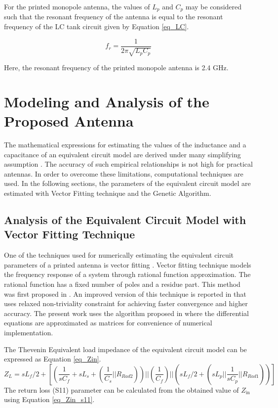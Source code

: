 For the printed monopole antenna, the values of $L_p$ and $C_p$ may be considered such that the resonant frequency of the antenna is equal to the resonant frequency of the LC tank circuit given by Equation \ref{eq_LC}.

\begin{equation}\label{eq_LC}
f_r = \frac{1}{2\pi \sqrt{L_p C_p}}
\end{equation}

Here, the resonant frequency of the printed monopole antenna is 2.4 GHz.

\section{Modeling and Analysis of the Proposed Antenna}\label{c4sec:analysis}
The mathematical expressions for estimating the values of the inductance and a capacitance of an equivalent circuit model are derived under many simplifying assumption \cite{handbook}. The accuracy of such empirical relationships is not high for practical antennas. In order to overcome these limitations, computational techniques are used. In the following sections, the parameters of the equivalent circuit model are estimated with Vector Fitting technique and the Genetic Algorithm.

\subsection{Analysis of the Equivalent Circuit Model with Vector Fitting Technique}
One of the techniques used for numerically estimating the equivalent circuit parameters of a printed antenna is vector fitting \cite{vectorfitting1, vectorfitting2, vectorfitting3}. Vector fitting technique models the frequency response of a system through rational function approximation. The rational function has a fixed number of poles and a residue part. This method was first proposed in \cite{vfit3_1}. An improved version of this technique is reported in \cite{vfit3_2} that uses relaxed non-triviality constraint for achieving faster convergence and higher accuracy. The present work uses the algorithm proposed in \cite{vfit3_3} where the differential equations are approximated as matrices for convenience of numerical implementation.

The Thevenin Equivalent load impedance of the equivalent circuit model can be expressed as Equation \ref{eq_Zin}.
{\small
\begin{equation}\label{eq_Zin}
Z_{L} = sL_f/2 + \left[\left(\frac{1}{sC_f}+sL_s+\left(\frac{1}{C_s} || R_{Rad2}\right)\right) || \left(\frac{1}{C_f}\right) || \left(sL_f/2 + \left(sL_p || \frac{1}{sC_p} || R_{Rad1}\right)\right)\right]
\end{equation}}
The return loss (S11) parameter can be calculated from the obtained value of $Z_{\text{in}}$ using Equation \ref{eq_Zin_s11}.


